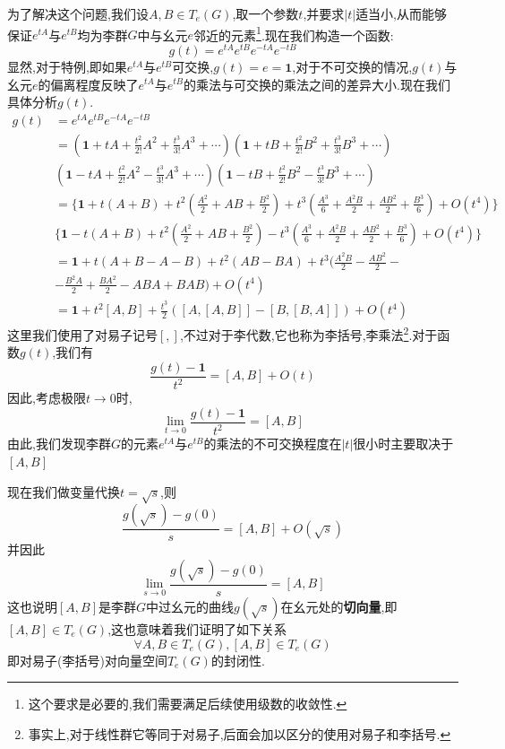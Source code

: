 为了解决这个问题,我们设$A,B\in T_e(G)$,取一个参数$t$,并要求$|t|$适当小,从而能够保证$e^{tA}$与$e^{tB}$均为李群$G$中与幺元$e$邻近的元素\footnote{这个要求是必要的,我们需要满足后续使用级数的收敛性.}.现在我们构造一个函数:
\begin{equation}
	g(t)=e^{tA}e^{tB}e^{-tA}e^{-tB}
\end{equation}
显然,对于特例,即如果$e^{tA}$与$e^{tB}$可交换,$g(t)=e=\textbf{1}$,对于不可交换的情况,$g(t)$与幺元$e$的偏离程度反映了$e^{tA}$与$e^{tB}$的乘法与可交换的乘法之间的差异大小.现在我们具体分析$g(t)$.
\begin{equation}
	\begin{aligned}
		g(t)& =e^{tA}e^{tB}e^{-tA}e^{-tB} \\
		&=(\textbf{1}+tA+\frac{t^{2}}{2!}A^{2}+\frac{t^{3}}{3!}A^{3}+\cdots)(\textbf{1}+tB+\frac{t^{2}}{2!}B^{2}+\frac{t^{3}}{3!}B^{3}+\cdots) \\
		&(\textbf{1}-tA+\frac{t^2}{2!}A^2-\frac{t^3}{3!}A^3+\cdots)(\textbf{1}-tB+\frac{t^2}{2!}B^2-\frac{t^3}{3!}B^3+\cdots) \\
		&=\{\textbf{1}+t(A+B)+t^{2}(\frac{A^{2}}{2}+AB+\frac{B^{2}}{2})+t^{3}(\frac{A^{3}}{6}+\frac{A^{2}B}{2}+\frac{AB^{2}}{2}+\frac{B^{3}}{6})+O(t^{4})\} \\
		&\{\textbf{1}-t(A+B)+t^2(\frac{A^2}{2}+AB+\frac{B^2}{2})-t^3(\frac{A^3}{6}+\frac{A^2B}{2}+\frac{AB^2}{2}+\frac{B^3}{6})+O(t^4)\} \\
		&=\textbf{1}+t(A+B-A-B)+t^{2}(AB-BA)+t^{3}(\frac{A^{2}B}{2}-\frac{AB^{2}}{2}- \\
		&-\frac{B^2A}{2}+\frac{BA^2}{2}-ABA+BAB)+O(t^4) \\
		&=\textbf{1}+t^{2}[A,B]+\frac{t^{3}}{2}([A,[A,B]]-[B,[B,A]])+O(t^{4})
	\end{aligned}
\end{equation}
这里我们使用了对易子记号$[,]$,不过对于李代数,它也称为李括号,李乘法\footnote{事实上,对于线性群它等同于对易子,后面会加以区分的使用对易子和李括号.}.对于函数$g(t)$,我们有
\begin{equation}
	\frac{g(t)-\textbf{1}}{t^2}=[A,B]+O(t)
\end{equation}
因此,考虑极限$t\to0$时,
\begin{equation}
	\lim_{t\to0}\frac{g(t)-\textbf{1}}{t^{2}}=[A,B]
\end{equation}
由此,我们发现李群$G$的元素$e^{tA}$与$e^{tB}$的乘法的不可交换程度在$|t|$很小时主要取决于$[A,B]$

现在我们做变量代换$t=\sqrt{s}$,则
\begin{equation}
	\frac{g(\sqrt{s})-g(0)}{s}=[A,B]+O(\sqrt{s})
\end{equation}
并因此
\begin{equation}
	\lim_{s\to0}\frac{g(\sqrt{s})-g(0)}{s}=[A,B]
\end{equation}
这也说明$[A,B]$是李群$G$中过幺元的曲线$g(\sqrt{s})$在幺元处的\textbf{切向量},即$[A,B]\in T_e(G)$,这也意味着我们证明了如下关系
\begin{equation}
	\forall A,B\in T_{e}(G) , [A,B]\in T_{e}(G)
\end{equation}
即对易子(李括号)对向量空间$T_e(G)$的封闭性.


